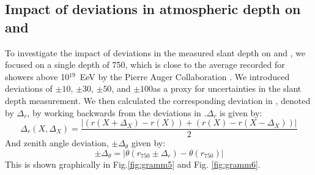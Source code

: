

\subsection{ Impact of deviations in atmospheric depth on  \rc and \thet}\label{sec:2}
To investigate the impact of deviations in the measured slant depth \x on \rc and \thet, we focused on a single depth of 750\gr, which is close to the average \xmax recorded for showers above 10$^{19}$ \,EeV by the Pierre Auger Collaboration \cite{Aab_2014}. We introduced deviations of $\pm10$\gr, $\pm30$\gr, $\pm50$\gr, and $\pm100$\gr as a proxy for uncertainties in the slant depth measurement. We then calculated the corresponding deviation in \rc, denoted by $\Delta_r$, by working backwards from the deviations in \x.$\Delta_r$ is given by: 
\begin{equation}\label{del_r}
 \Delta_r(X,\Delta_X)=\frac{|(r(X+\Delta_X)-r(X)) + (r(X)-r(X-\Delta_X))|}{2}
\end{equation}
And zenith angle deviation, $\pm \Delta_\theta$ given by:
\begin{equation}\label{del_t}
\pm \Delta_\theta = |\theta(r_{750}\pm \Delta_r)-\theta(r_{750})|
\end{equation}
 This is shown graphically in Fig.\ref{fig:gramm5} and Fig. \ref{fig:gramm6}.

